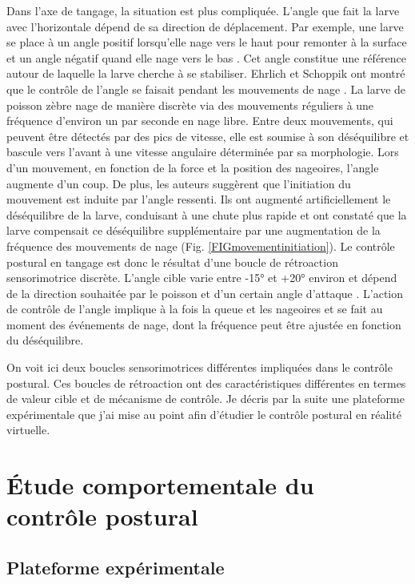 Dans l'axe de tangage, la situation est plus compliquée. L'angle que fait la larve avec l'horizontale dépend de sa direction de déplacement. Par exemple, une larve se place à un angle positif lorsqu'elle nage vers le haut pour remonter à la surface et un angle négatif quand elle nage vers le bas \cite{ehrlich_primal_2019}. Cet angle constitue une référence autour de laquelle la larve cherche à se stabiliser. Ehrlich et Schoppik ont montré que le contrôle de l'angle se faisait pendant les mouvements de nage \cite{ehrlich_control_2017}. La larve de poisson zèbre nage de manière discrète via des mouvements réguliers à une fréquence d'environ un par seconde en nage libre. Entre deux mouvements, qui peuvent être détectés par des pics de vitesse, elle est soumise à son déséquilibre et bascule vers l'avant à une vitesse angulaire déterminée par sa morphologie. Lors d'un mouvement, en fonction de la force et la position des nageoires, l'angle augmente d'un coup. De plus, les auteurs suggèrent que l'initiation du mouvement est induite par l'angle ressenti. Ils ont augmenté artificiellement le déséquilibre de la larve, conduisant à une chute plus rapide et ont constaté que la larve compensait ce déséquilibre supplémentaire par une augmentation de la fréquence des mouvements de nage (Fig. \ref{FIGmovementinitiation}).
Le contrôle postural en tangage est donc le résultat d'une boucle de rétroaction sensorimotrice discrète. L'angle cible varie entre -15° et +20° environ et dépend de la direction souhaitée par le poisson et d'un certain angle d'attaque \cite{ehrlich_primal_2019}. L'action de contrôle de l'angle implique à la fois la queue et les nageoires et se fait au moment des événements de nage, dont la fréquence peut être ajustée en fonction du déséquilibre.

On voit ici deux boucles sensorimotrices différentes impliquées dans le contrôle postural. Ces boucles de rétroaction ont des caractéristiques différentes en termes de valeur cible et de mécanisme de contrôle. Je décris par la suite une plateforme expérimentale que j'ai mise au point afin d'étudier le contrôle postural en réalité virtuelle.

\section{Étude comportementale du contrôle postural}

\subsection{Plateforme expérimentale}

